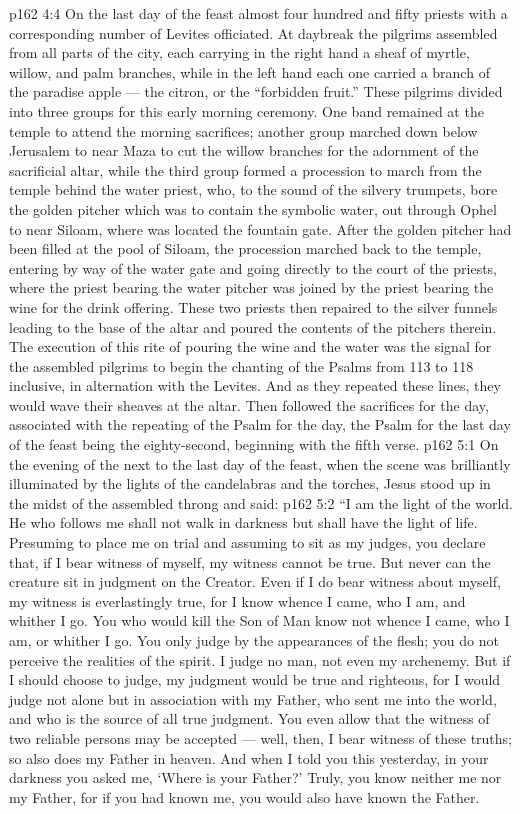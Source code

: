 \vs p162 4:4 \pc On the last day of the feast almost four hundred and fifty priests with a corresponding number of Levites officiated. At daybreak the pilgrims assembled from all parts of the city, each carrying in the right hand a sheaf of myrtle, willow, and palm branches, while in the left hand each one carried a branch of the paradise apple --- the citron, or the “forbidden fruit.” These pilgrims divided into three groups for this early morning ceremony. One band remained at the temple to attend the morning sacrifices; another group marched down below Jerusalem to near Maza to cut the willow branches for the adornment of the sacrificial altar, while the third group formed a procession to march from the temple behind the water priest, who, to the sound of the silvery trumpets, bore the golden pitcher which was to contain the symbolic water, out through Ophel to near Siloam, where was located the fountain gate. After the golden pitcher had been filled at the pool of Siloam, the procession marched back to the temple, entering by way of the water gate and going directly to the court of the priests, where the priest bearing the water pitcher was joined by the priest bearing the wine for the drink offering. These two priests then repaired to the silver funnels leading to the base of the altar and poured the contents of the pitchers therein. The execution of this rite of pouring the wine and the water was the signal for the assembled pilgrims to begin the chanting of the Psalms from 113 to 118 inclusive, in alternation with the Levites. And as they repeated these lines, they would wave their sheaves at the altar. Then followed the sacrifices for the day, associated with the repeating of the Psalm for the day, the Psalm for the last day of the feast being the eighty\hyp{}second, beginning with the fifth verse.
\vs p162 5:1 On the evening of the next to the last day of the feast, when the scene was brilliantly illuminated by the lights of the candelabras and the torches, Jesus stood up in the midst of the assembled throng and said:
\vs p162 5:2 \pc \textcolor{ubdarkred}{“I am the light of the world. He who follows me shall not walk in darkness but shall have the light of life. Presuming to place me on trial and assuming to sit as my judges, you declare that, if I bear witness of myself, my witness cannot be true. But never can the creature sit in judgment on the Creator. Even if I do bear witness about myself, my witness is everlastingly true, for I know whence I came, who I am, and whither I go. You who would kill the Son of Man know not whence I came, who I am, or whither I go. You only judge by the appearances of the flesh; you do not perceive the realities of the spirit. I judge no man, not even my archenemy. But if I should choose to judge, my judgment would be true and righteous, for I would judge not alone but in association with my Father, who sent me into the world, and who is the source of all true judgment. You even allow that the witness of two reliable persons may be accepted --- well, then, I bear witness of these truths; so also does my Father in heaven. And when I told you this yesterday, in your darkness you asked me, ‘Where is your Father?’ Truly, you know neither me nor my Father, for if you had known me, you would also have known the Father.}
